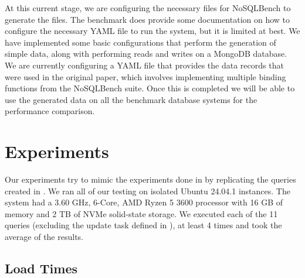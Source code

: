 \documentclass[sigconf]{acmart}
\begin{document}
    At this current stage, we are configuring the necessary files for NoSQLBench to generate the files. The benchmark does provide some documentation on how to configure the necessary YAML file to run the system, but it is limited at best. We have implemented some basic configurations that perform the generation of simple data, along with performing reads and writes on a MongoDB database. We are currently configuring a YAML file that provides the data records that were used in the original paper, which involves implementing multiple binding functions from the NoSQLBench suite. Once this is completed we will be able to use the generated data on all the benchmark database systems for the performance comparison.

\section{Experiments}

Our experiments try to mimic the experiments done in \cite{Tahara_Diamond_Abadi_2014} by replicating the queries created in \cite{Chasseur_Li_Patel_2013}. We ran all of our testing on isolated Ubuntu 24.04.1 instances. The system had a 3.60 GHz, 6-Core, AMD Ryzen 5 3600 processor with 16 GB of memory and 2 TB of NVMe solid-state storage. We executed each of the 11 queries (excluding the update task defined in \cite{Tahara_Diamond_Abadi_2014}), at least 4 times and took the average of the results. 

\subsection{Load Times}
\end{document}
